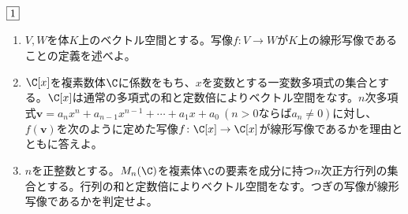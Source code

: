 \begin{tcolorbox} %
	$\fbox{1}$
\begin{enumerate}
	\item $V, W$を体$K$上のベクトル空間とする。写像$f\colon V\to W$が$K$上の線形写像であることの定義を述べよ。
	\item $\C[x]$を複素数体$\C$に係数をもち、$x$を変数とする一変数多項式の集合とする。$\C[x]$は通常の多項式の和と定数倍によりベクトル空間をなす。$n$次多項式$\bm{v}= a_n x^n+ a_{n- 1}x^{n- 1}+ \cdots+ a_1 x+ a_0\ (n> 0ならばa_n\ne 0)$に対し、$f(\bm{v})$を次のように定めた写像$f\colon \C[x]\to \C[x]$が線形写像であるかを理由とともに答えよ。
	\item $n$を正整数とする。$M_n(\C)$を複素体$\C$の要素を成分に持つ$n$次正方行列の集合とする。行列の和と定数倍によりベクトル空間をなす。つぎの写像が線形写像であるかを判定せよ。
\end{enumerate}
\end{tcolorbox}

